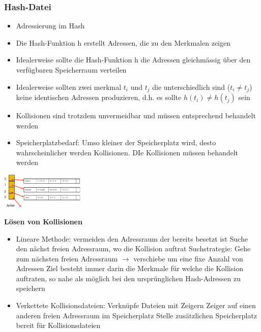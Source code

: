 \documentclass{report}
\newenvironment{Figure}
	{\par\medskip\noindent\minipage{\linewidth}}
	{\endminipage\par\medskip}
\theoremstyle{definition}
\theoremstyle{example}
\begin{document}
\subsubsection{Hash-Datei}
\begin{itemize}
   \item Adressierung im Hash
   \item Die Hash-Funktion h erstellt Adressen, die zu den Merkmalen zeigen
   \item Idealerweise sollte die Hash-Funktion h die Adressen gleichmässig über den verfügbaren Speicherraum verteilen
   \item Idealerweise sollten zwei merkmal $t_i$ und $t_j$ die unterschiedlich sind ($t_i \neq t_j$) keine identischen Adressen produzieren, d.h. es sollte $h(t_i) \neq h(t_j)$ sein
   \item Kollisionen sind trotzdem unvermeidbar und müssen entsprechend behandelt werden
   \item Speicherplatzbedarf: Umso kleiner der Speicherplatz wird, desto wahrscheinlicher werden Kollisionen. DIe Kollisionen müssen behandelt werden
\end{itemize}

\begin{Figure}
   \centering
    \includegraphics[width=150px]{img/HashDatei.png}
        \label{fig:Abbildung einer Hash-Datei}
\end{Figure}

\textbf{Lösen von Kollisionen}
\begin{itemize}
   \item Lineare Methode: vermeiden den Adressraum der bereits besetzt ist
   \subitem Suche den nächst freien Adressraum, wo die Kollision auftrat
   \subitem Suchstrategie: Gehe zum nächsten freien Adressraum $\rightarrow$ verschiebe um eine fixe Anzahl von Adressen
   \subitem Ziel besteht immer darin die Merkmale für welche die Kollision auftraten, so nahe als möglich bei den ursprünglichen Hash-Adressen zu speichern 
   \item Verkettete Kollisionsdateien: Verknüpfe Dateien mit Zeigern
   \subitem Zeiger auf einen anderen freien Adressraum im Speicherplatz
   \subitem Stelle zusätzlichen Speicherplatz bereit für Kollisionsdateien
\end{itemize}
\end{document}

